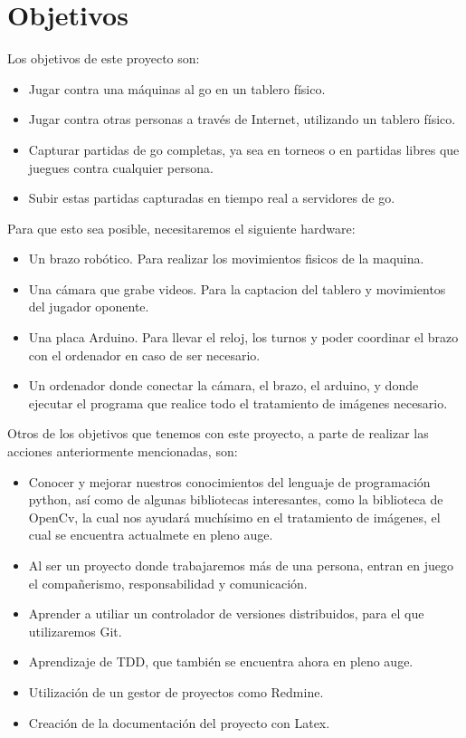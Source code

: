 \documentclass[12pt,a4paper]{report}
\begin{document}
\section{Objetivos} 

Los objetivos de este proyecto son: 
\begin{itemize}
    \item Jugar contra una máquinas al go en un tablero físico. 
    \item Jugar contra otras personas a través de Internet, utilizando un
    tablero físico. 
    \item Capturar partidas de go completas, ya sea en torneos o en partidas
    libres que juegues contra cualquier persona. 
    \item Subir estas partidas capturadas en tiempo real a servidores de go. 
\end{itemize}

Para que esto sea posible, necesitaremos el siguiente hardware:
\begin{itemize}
    \item Un brazo robótico. Para realizar los movimientos fisicos de la maquina.
    \item Una cámara que grabe videos. Para la captacion del tablero y
    movimientos del jugador oponente.
    \item Una placa Arduino. Para llevar el reloj, los turnos y poder coordinar
    el brazo con el ordenador en caso de ser necesario. 
    \item Un ordenador donde conectar la cámara, el brazo, el arduino, y donde
    ejecutar el programa que realice todo el tratamiento de imágenes necesario.
\end{itemize}


Otros de los objetivos que tenemos con este proyecto, a parte de realizar las
acciones anteriormente mencionadas, son: 
\begin{itemize}
    \item Conocer y mejorar nuestros conocimientos del lenguaje de programación
    python, así como de algunas bibliotecas interesantes, como la biblioteca de
    OpenCv, la cual nos ayudará muchísimo en el tratamiento de imágenes, el cual
    se encuentra actualmete en pleno auge. 
    \item Al ser un proyecto donde trabajaremos más de una persona, entran en
    juego el compañerismo, responsabilidad y comunicación. 
    \item Aprender a utiliar un controlador de versiones distribuidos, para el
    que utilizaremos Git. 
    \item Aprendizaje de TDD, que también se encuentra ahora en pleno auge. 
    \item Utilización de un gestor de proyectos como Redmine. 
    \item Creación de la documentación del proyecto con Latex. 
\end{itemize}
\end{document}
